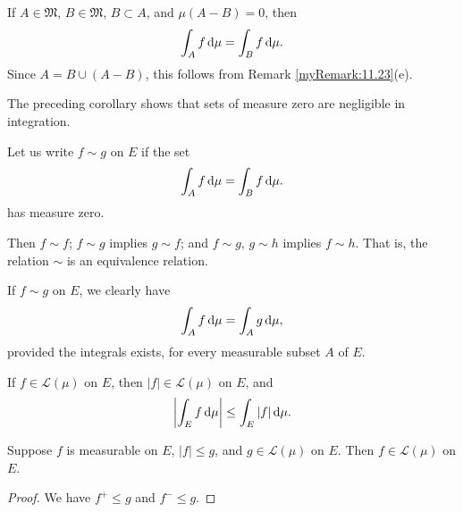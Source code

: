 \begin{myCorollary*}
    If $A \in \mathfrak{M}$, $B \in \mathfrak{M}$, $B \subset A$, and $\mu(A-B)=0$, then
    \begin{equation*}
        \int_A f \d \mu = 
        \int_B f \d \mu .
    \end{equation*}
    Since $A =B\cup (A - B)$, this follows from Remark \ref{myRemark:11.23}(e).
\end{myCorollary*}

\begin{myRemark}
    \label{myRemark:11.25}
    The preceding corollary shows that sets of measure zero are negligible in integration. 

    Let us write $f \sim g$ on $E$ if the set
    \begin{equation*}
        \int_A f \d \mu =
        \int_B f \d \mu .
    \end{equation*}
    has measure zero.

    Then $f \sim f$; $f \sim g$ implies $g \sim f$; 
    and  $f \sim g$, $g \sim h$ implies $f \sim h$.
    That is, the relation $\sim$ is an equivalence relation.

    If $f \sim g$ on $E$, we clearly have 
    \begin{equation*}
        \int_A f \d \mu =
        \int_A g \d \mu ,
    \end{equation*}
    provided the integrals exists, for every measurable subset $A$ of $E$.
\end{myRemark}

\begin{thm}
    \label{thm:11.26}
    If $f \in \mathscr{L}(\mu)$ on $E$, then $\left| f \right| \in \mathscr{L}(\mu)$ on $E$, and 
    \begin{equation}
        \label{eq:11.63}
        \left| \int_E f \d \mu \right| \leq
        \int_E \left| f \right| \d \mu .
    \end{equation}
\end{thm}

\begin{thm}
    \label{thm:11.27}
    Suppose $f$ is measurable on $E$, $\left| f \right| \leq g$, and $g \in \mathscr{L}(\mu)$ on $E$. 
    Then $f \in \mathscr{L}(\mu)$ on $E$.
\end{thm}

\begin{proof}
    We have $f^+ \leq g$ and $f^- \leq g$.
\end{proof}

